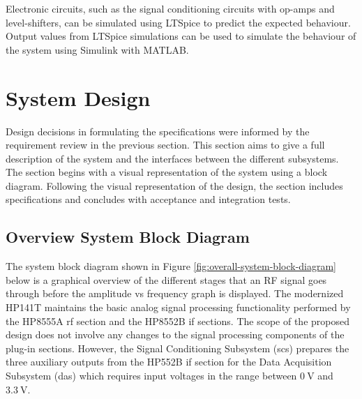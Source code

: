 \documentclass[class=report,11pt,crop=false]{standalone}
\begin{document}
	Electronic circuits, such as the signal conditioning circuits with op-amps and level-shifters, can be simulated using LTSpice to predict the expected behaviour. Output values from LTSpice simulations can be used to simulate the behaviour of the system using Simulink with MATLAB.
			
	\section{System Design}
	
	Design decisions in formulating the specifications were informed by the requirement review in the previous section. This section aims to give a full description of the system and the interfaces between the different subsystems. The section begins with a visual representation of the system using a block diagram. Following the visual representation of the design, the section includes specifications and concludes with acceptance and integration tests. 
	
	\subsection{Overview System Block Diagram}
	
	The system block diagram shown in Figure \ref{fig:overall-system-block-diagram} below is a graphical overview of the different stages that an RF signal goes through before the amplitude vs frequency graph is displayed. The modernized HP141T maintains the basic analog signal processing functionality performed by the HP8555A \acrshort{rf} section and the HP8552B \acrshort{if} sections. The scope of the proposed design does not involve any changes to the signal processing components of the plug-in sections. However, the Signal Conditioning Subsystem (\acrshort{scs}) prepares the three auxiliary outputs from the HP552B \acrshort{if} section for the Data Acquisition Subsystem (\acrshort{das}) which requires input voltages in the range between $\SI{0}{\volt}$ and $\SI{3.3}{\volt}$. 	
	
\end{document}
